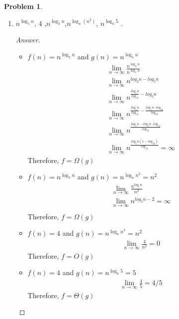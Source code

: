 \documentclass[11pt]{article}
\theoremstyle{definition}
\theoremstyle{definition}
\newtheorem{required}{Problem}
\theoremstyle{definition}
\begin{document}
\begin{required}
\begin{enumerate}[label=(\alph*)]
\subsection{Problem 2\ref{2a}}
        \item \label{2a} $n^{\log_5 n}$, \qquad $4$ ,\qquad $n^{\log_3 n}$,\qquad  $n^{\log_n(n^2)}$, \qquad $ n^{\log_n 5}$ .
        \begin{proof}[Answer] $ $\\
        \begin{itemize}
        \item $f(n) = n^{\log_3 n}$ and $g(n) = n^{\log_5 n}$ 
        \begin{align*}
             \lim_{n \to \infty} \frac{n^{\log_3 n}}{n^{\log_5 n}} \\
              \lim_{n \to \infty} n^{log_3n - log_5n} \\
              \lim_{n \to \infty} n^{\frac{log_5n}{log_53} - log_5n}\\
              \lim_{n \to \infty} n^{\frac{log_5n}{log_53} - \frac{log_5n \cdot log_53}{log_53}} \\
              \lim_{n \to \infty} n^{\frac{log_5n - log_5n \cdot log_53}{log_53}} \\
              \lim_{n \to \infty} n^{\frac{log_5n (1-log_53)}{log_53}} = \infty 
        \end{align*}
        Therefore, $f=\Omega(g)$ 
        \item $f(n) = n^{\log_5 n}$ and $g(n) = n^{\log_n n^2} = n^2$
        \begin{align*}
            \lim_{n \to \infty} \frac{n^{log_5n}}{n^2} \\
             \lim_{n \to \infty} n^{log_5n-2} = \infty\\ 
        \end{align*}
        Therefore, $f=\Omega(g)$ 
         \item $f(n) = 4$ and $g(n) = n^{\log_n n^2} = n^2$
         \begin{align*}
             \lim_{n \to \infty} \frac{4}{n^2} = 0
         \end{align*}
         Therefore, $f=O(g)$ 
         \item $f(n) = 4$ and $g(n) = n^{\log_n 5} = 5$
         \begin{align*}
            \lim_{n \to \infty} \frac{4}{5} = 4/5
         \end{align*}
         Therefore, $f=\Theta(g)$ 
        \end{itemize}

\end{proof}
\end{enumerate}
\end{required}
\end{document}
